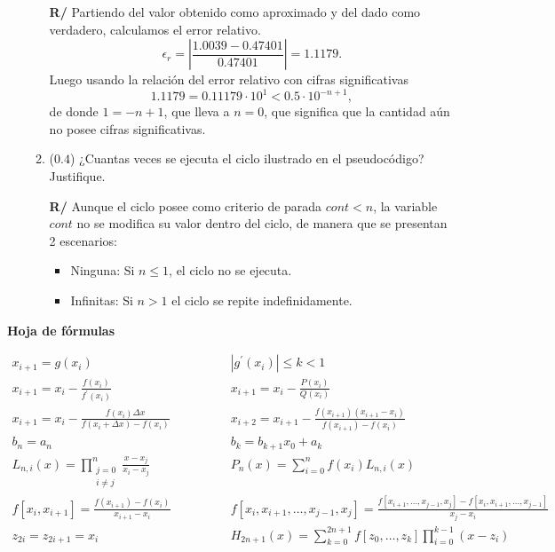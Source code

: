 \documentclass[12pt]{article}
\begin{document}
\begin{enumerate}[leftmargin=*,widest=9]
\begin{enumerate}[label=\alph*]
\textbf{R/} Partiendo del valor obtenido como aproximado y del dado como verdadero, calculamos el error relativo.
\[\epsilon_r = \left|\frac{1.0039-0.47401}{0.47401}\right| = 1.1179.\]
Luego usando la relación del error relativo con cifras significativas
\[ 1.1179 = 0.11179 \cdot 10^1 < 0.5 \cdot 10^{-n+1},\]
de donde \(1 = -n + 1\), que lleva a \(n=0\), que significa que la cantidad aún no posee cifras significativas.
\item (\(0.4\)) ¿Cuantas veces se ejecuta el ciclo ilustrado en el pseudocódigo? Justifique.

\textbf{R/} Aunque el ciclo posee como criterio de parada \(cont<n\), la variable \(cont\) no se modifica su valor dentro del ciclo, de manera que se presentan 2 escenarios:
\begin{itemize}
\item Ninguna: Si \(n \leq 1\), el ciclo no se ejecuta.
\item Infinitas: Si \(n > 1\) el ciclo se repite indefinidamente.
\end{itemize}
\end{enumerate}
\end{enumerate}
\begin{center}
\textbf{Hoja de fórmulas}
\vspace{-.5cm}
\end{center}
{\large
\[
\begin{array}{cc}
x_{i+1} = g(x_i) \qquad & \qquad |g^\prime(x_i)| \leq k < 1 \\
x_{i+1} = x_i - \frac{f(x_i)}{f^\prime(x_i)} \qquad & \qquad x_{i+1} = x_i - \frac{P(x_i)}{Q(x_i)} \\
x_{i+1} = x_i - \frac{f(x_i) \Delta x}{f(x_i + \Delta x) - f(x_i)} \qquad & \qquad x_{i+2} = x_{i+1} - \frac{f(x_{i+1}) (x_{i+1}-x_i)}{f(x_{i+1}) - f(x_i)} \\
b_n = a_n \qquad & \qquad
b_k = b_{k+1}x_0 + a_k \\
L_{n, i}(x) = \prod\limits_{\substack{j=0\\ i \neq j}}^n \frac{x - x_j}{x_i - x_j} \qquad & \qquad
P_n(x) = \sum\limits_{i = 0}^n f(x_i)L_{n,i}(x) \\
f\left[x_i, x_{i+1}\right] = \frac{f(x_{i+1})-f(x_i)}{x_{i+1}-x_i} \qquad & \qquad
f\left[ x_i, x_{i+1}, \ldots, x_{j-1}, x_j\right] = \frac{f\left[x_{i+1}, \ldots, x_{j-1}, x_j\right] - f\left[ x_i, x_{i+1}, \ldots, x_{j-1} \right]}{x_j - x_i} \\
z_{2i} = z_{2i+1} = x_i \qquad & \qquad
H_{2n+1}(x) = \sum\limits_{k=0}^{2n+1} f\left[z_0, \ldots, z_k\right] \prod\limits_{i = 0}^{k-1}(x-z_i) %
\end{array}
\]
}
\end{document}
